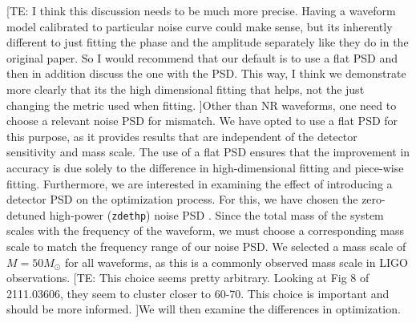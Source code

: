 \documentclass[twocolumn]{aastex631}
\newcommand{\zdethp}{\texttt{zdethp}}
\newcommand{\te}[1]{{\color{rr}[TE: #1 ]}}
\begin{document}
\te{I think this discussion needs to be much more precise. Having a waveform model calibrated to particular noise curve could make sense, but its inherently different to just fitting the phase and the amplitude separately like they do in the original paper. So I would recommend that our default is to use a flat PSD and then in addition discuss the one with the PSD. This way, I think we demonstrate more clearly that its the high dimensional fitting that helps, not the just changing the metric used when fitting.}Other than NR waveforms, one need to choose a relevant noise PSD for 
mismatch. We have opted to use a flat PSD for this purpose, as it provides results that are independent of the detector sensitivity and mass scale. The use of a flat PSD ensures that the improvement in accuracy is due solely to the difference in high-dimensional fitting and piece-wise fitting. Furthermore, we are interested in examining the effect of introducing a detector PSD on the optimization process. For this, we have chosen the zero-detuned high-power (\zdethp) noise PSD \citep{aasi2015advanced}. Since the total mass of the system scales with the frequency of the waveform, we must choose a corresponding mass scale to match the frequency range of our noise PSD. We selected a mass scale of $M=50M_{\odot}$ for all waveforms, as this is a commonly observed mass scale in LIGO observations. \te{This choice seems pretty arbitrary. Looking at Fig 8 of 2111.03606, they seem to cluster closer to 60-70. This choice is important and should be more informed.}We will then examine the differences in optimization.

\end{document}
